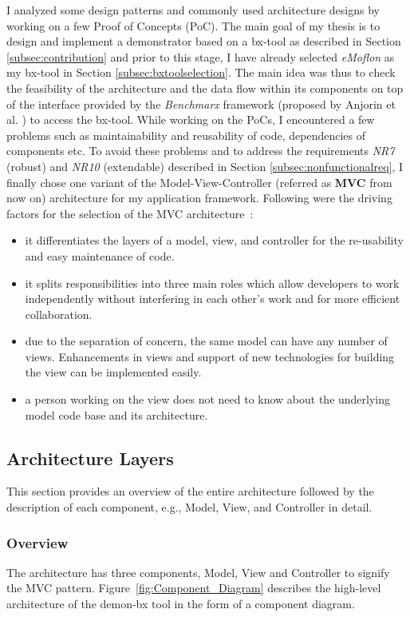 I analyzed some design patterns and commonly used architecture designs by working on a few Proof of Concepts (PoC). The main goal of my thesis is to design and implement a demonstrator based on a bx-tool as described in Section \ref{subsec:contribution} and prior to this stage, I have already selected \textit{eMoflon} as my bx-tool in Section \ref{subsec:bxtoolselection}. The main idea was thus to check the feasibility of the architecture and the data flow within its components on top of the interface provided by the \textit{Benchmarx} framework (proposed by Anjorin et al. \cite{benchmarx-reload}) to access the bx-tool. While working on the PoCs, I encountered a few problems such as maintainability and reusability of code, dependencies of components etc. To avoid these problems and to address the requirements \textit{NR7} (robust) and \textit{NR10} (extendable) described in Section \ref{subsec:nonfunctionalreq}, I finally chose one variant of the Model-View-Controller (referred as \textbf{MVC} from now on) architecture for my application framework. Following were the driving factors for the selection of the MVC architecture~\cite{designpattern-notes}\cite{designpattern-headfirst}:
\begin{itemize}
	\item {it differentiates the layers of a model, view, and controller for the re-usability and easy maintenance of code.}
	\item {it splits responsibilities into three main roles which allow developers to work independently without interfering in each other's work and for more efficient collaboration.}
	\item {due to the separation of concern, the same model can have any number of views. Enhancements in views and support of new technologies for building the view can be implemented easily.}
	\item {a person working on the view does not need to know about the underlying model code base and its architecture.}
\end{itemize}

\subsection{Architecture Layers}\label{subsec:design_layers}
This section provides an overview of the entire architecture followed by the description of each component, e.g., Model, View, and Controller in detail.

\subsubsection{Overview}\label{subsubsec:design_overview}
The architecture has three components, Model, View and Controller to signify the MVC pattern. Figure~\ref{fig:Component_Diagram} describes the high-level architecture of the demon-bx tool in the form of a component diagram.
       
